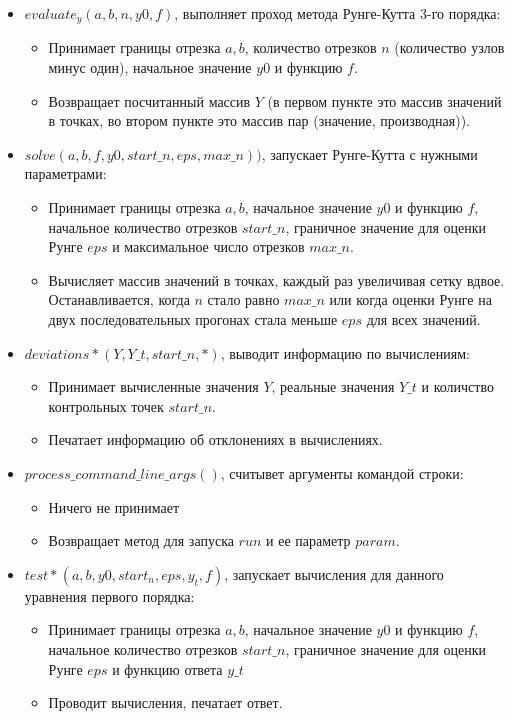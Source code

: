\documentclass[paper=a4, fontsize=11pt]{scrartcl} %
\numberwithin{equation}{section} %
\numberwithin{figure}{section} %
\numberwithin{table}{section} %
\begin{document}
\begin{itemize}
	\item $evaluate_y(a, b, n, y0, f)$, выполняет проход метода Рунге-Кутта 3-го порядка:
		\begin{itemize}
		\item Принимает границы отрезка $a, b$, количество отрезков $n$ (количество узлов минус один), начальное значение $y0$ и функцию $f$.
		\item Возвращает посчитанный массив $Y$ (в первом пункте это массив значений в точках, во втором пункте это массив пар (значение, производная)).
		\end{itemize}
	\item $solve(a, b, f, y0, start\_n, eps, max\_n))$, запускает Рунге-Кутта с нужными параметрами:
		\begin{itemize}
		\item Принимает границы отрезка $a, b$, начальное значение $y0$ и функцию $f$, начальное количество отрезков $start\_n$, граничное значение для оценки Рунге $eps$ и максимальное число отрезков $max\_n$.
		\item Вычисляет массив значений в точках, каждый раз увеличивая сетку вдвое. Останавливается, когда $n$ стало равно $max\_n$ или когда оценки Рунге на двух последовательных прогонах стала меньше $eps$ для всех значений.
		\end{itemize}
    \item $deviations*(Y, Y\_t, start\_n, *)$, выводит информацию по вычислениям:
        \begin{itemize}
		\item Принимает вычисленные значения $Y$, реальные значения $Y\_t$ и количство контрольных точек $start\_n$.
		\item Печатает информацию об отклонениях в вычислениях.
		\end{itemize}
    \item $process\_command\_line\_args()$, считывет аргументы командой строки:
        \begin{itemize}
		\item Ничего не принимает
		\item Возвращает метод для запуска $run$ и ее параметр $param$.
		\end{itemize}
    \item $test*(a, b, y0, start_n, eps, y_t, f)$, запускает вычисления для данного уравнения первого порядка:
        \begin{itemize}
		\item Принимает границы отрезка $a, b$, начальное значение $y0$ и функцию $f$, начальное количество отрезков $start\_n$, граничное значение для оценки Рунге $eps$ и функцию ответа $y\_t$
		\item Проводит вычисления, печатает ответ.
		\end{itemize}
\end{itemize}
\end{document}
